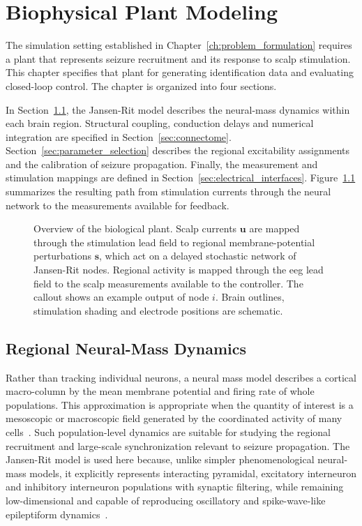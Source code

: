 \chapter{Biophysical Plant Modeling}
\label{ch:biological_plant_modeling}

The simulation setting established in Chapter~\ref{ch:problem_formulation} requires a plant that represents seizure recruitment and its response to scalp stimulation.
This chapter specifies that plant for generating identification data and evaluating closed-loop control.
The chapter is organized into four sections.

In Section~\ref{sec:regional_neural_mass}, the Jansen-Rit model describes the neural-mass dynamics within each brain region.
Structural coupling, conduction delays and numerical integration are specified in Section~\ref{sec:connectome}.
Section~\ref{sec:parameter_selection} describes the regional excitability assignments and the calibration of seizure propagation.
Finally, the measurement and stimulation mappings are defined in Section~\ref{sec:electrical_interfaces}.
Figure~\ref{fig:plant_overview} summarizes the resulting path from stimulation currents through the neural network to the measurements available for feedback.


\begin{figure}
    \centering
    
    \caption{Overview of the biological plant. Scalp currents $\mathbf{u}$ are mapped through the stimulation lead field to regional membrane-potential perturbations $\mathbf{s}$, which act on a delayed stochastic network of Jansen-Rit nodes. Regional activity is mapped through the \ac{eeg} lead field to the scalp measurements available to the controller. The callout shows an example output of node $i$. Brain outlines, stimulation shading and electrode positions are schematic.}
    \label{fig:plant_overview}
\end{figure}

\section{Regional Neural-Mass Dynamics}
\label{sec:regional_neural_mass}

Rather than tracking individual neurons, a neural mass model describes a cortical macro-column by the mean membrane potential and firing rate of whole populations.
This approximation is appropriate when the quantity of interest is a mesoscopic or macroscopic field generated by the coordinated activity of many cells~\cite{LopesDaSilva1974,Buzsaki2012}.
Such population-level dynamics are suitable for studying the regional recruitment and large-scale synchronization relevant to seizure propagation.
The Jansen-Rit model is used here because, unlike simpler phenomenological neural-mass models, it explicitly represents interacting pyramidal, excitatory interneuron and inhibitory interneuron populations with synaptic filtering, while remaining low-dimensional and capable of reproducing oscillatory and spike-wave-like epileptiform dynamics~\cite{Jansen1995,Wendling2002,Yu2024}.


